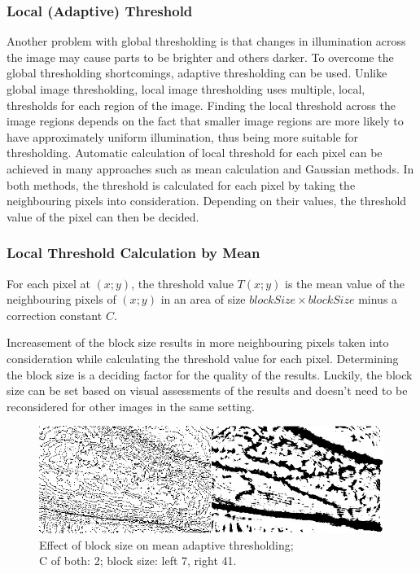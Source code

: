 \subsubsection{Local (Adaptive) Threshold}
Another problem with global thresholding is that changes in illumination across the image may cause parts to be brighter and others darker. To overcome the global thresholding shortcomings, adaptive thresholding can be used. 
Unlike global image thresholding, local image thresholding uses multiple, local, thresholds for each region of the image. Finding the local threshold across the image regions depends on the fact that smaller image regions are more likely to have approximately uniform illumination, thus being more suitable for thresholding. Automatic calculation of local threshold for each pixel can be achieved in many approaches such as mean calculation and Gaussian methods. In both methods, the threshold is calculated for each pixel by taking the neighbouring pixels into consideration. Depending on their values, the threshold value of the pixel can then be decided.

\subsubsection{Local Threshold Calculation by Mean}
For each pixel at $(x; y)$, the threshold value $T(x; y)$ is the mean value of the neighbouring pixels of $(x; y)$ in an area of size $blockSize \times blockSize$ minus a correction constant $C$. 

Increasement of the block size results in more neighbouring pixels taken into consideration while calculating the threshold value for each pixel. Determining the block size is a deciding factor for the quality of the results. Luckily, the block size can be set based on visual assessments of the results and doesn’t need to be reconsidered for other images in the same setting. 

\begin{figure}[H]
\centering
\includegraphics[scale=0.8]{figures/compare1.JPG}
\caption[Effect of block size on mean adaptive thresholding]{Effect of block size on mean adaptive thresholding;\\C of both: 2; block size: left 7, right 41.}\label{fig:compare1}
\end{figure}

